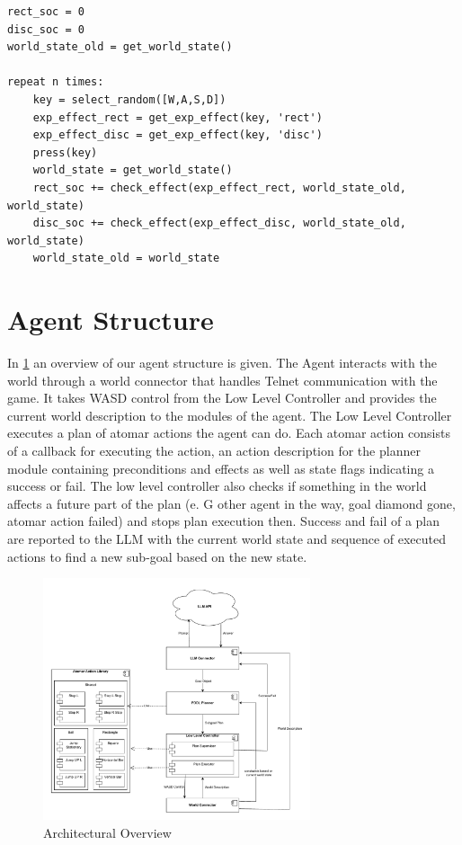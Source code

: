 \documentclass{article}
\begin{document}
\begin{verbatim}
rect_soc = 0
disc_soc = 0
world_state_old = get_world_state()

repeat n times:
    key = select_random([W,A,S,D])
    exp_effect_rect = get_exp_effect(key, 'rect')
    exp_effect_disc = get_exp_effect(key, 'disc')
    press(key)
    world_state = get_world_state()
    rect_soc += check_effect(exp_effect_rect, world_state_old, world_state)
    disc_soc += check_effect(exp_effect_disc, world_state_old, world_state)
    world_state_old = world_state

\end{verbatim}

\section{Agent Structure}

In \ref{fig:architecture} an overview of our agent structure is given. The Agent interacts with the world through a world connector that handles Telnet communication with the game. It takes WASD control from the Low Level Controller and provides the current world description to the modules of the agent. The Low Level Controller executes a plan of atomar actions the agent can do. Each atomar action consists of a callback for executing the action, an action description for the planner module containing preconditions and effects as well as state flags indicating a success or fail. The low level controller also checks if something in the world affects a future part of the plan (e. G other agent in the way, goal diamond gone, atomar action failed) and stops plan execution then. Success and fail of a plan are reported to the LLM with the current world state and sequence of executed actions to find a new sub-goal based on the new state.
\begin{figure}[h]
\caption{Architectural Overview}
\label{fig:architecture}
\centering
\includegraphics[width=0.7\textwidth]{graphic/IA_llm_agent.pdf}
\end{figure}
\end{document}
